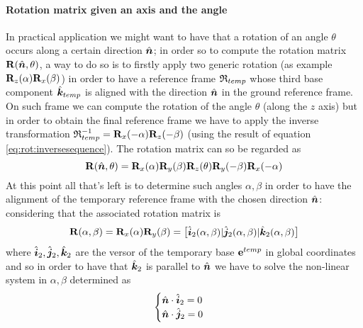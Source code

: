 		\paragraph{Rotation matrix given an axis and the angle} In practical application we might want to have that a rotation of an angle $\theta$ occurs along a certain direction $\hat{\boldsymbol{n}}$; in order so to compute the rotation matrix $\mathbf{R}(\hat{\boldsymbol{n}}, \theta)$, a way to do so is to firstly apply two generic rotation (as example $\mathbf{R}_z(\alpha) \mathbf{R}_x(\beta)$) in order to have a reference frame $\mathfrak {R}_{temp}$ whose third base component $\hat{\boldsymbol{k}}_{temp}$ is aligned with the direction $\hat{\boldsymbol{n}}$ in the ground reference frame. On such frame we can compute the rotation of the angle $\theta$ (along the $z$ axis) but in order to obtain the final reference frame we have to apply the inverse transformation $\mathfrak {R}_{temp}^{-1} = \mathbf{R}_x(-\alpha) \mathbf{R}_z(-\beta)$ (using the result of equation \ref{eq:rot:inversesequence}). The rotation matrix can so be regarded as
		\begin{equation}
			\mathbf{R}(\hat{\boldsymbol{n}},\theta) = \mathbf{R}_x(\alpha) \mathbf{R}_y(\beta) \mathbf{R}_z(\theta) \mathbf{R}_y(-\beta) \mathbf{R}_x(-\alpha)
		\end{equation}
		At this point all that's left is to determine such angles $\alpha,\beta$ in order to have the alignment of the temporary reference frame with the chosen direction $\hat{\boldsymbol{n}}$: considering that the associated rotation matrix is
		\[ \mathbf{R}(\alpha,\beta) = \mathbf{R}_x(\alpha) \mathbf{R}_y(\beta) = \begin{bmatrix} \hat{\boldsymbol{i}}_2(\alpha,\beta) | \hat{\boldsymbol{j}}_2(\alpha,\beta) | \hat{\boldsymbol{k}}_2(\alpha,\beta) \end{bmatrix} \]
		where $\hat{\boldsymbol{i}}_2,\hat{\boldsymbol{j}}_2,\hat{\boldsymbol{k}}_2$ are the versor of the temporary base $\mathbf{e}^{temp}$ in global coordinates and so in order to have that $\hat{\boldsymbol{k}}_2$ is parallel to $\hat{\boldsymbol{n}}$ we have to solve the non-linear system in $\alpha,\beta$ determined as
		\[ \begin{cases}
			\hat{\boldsymbol{n}} \cdot \hat{\boldsymbol{i}}_2 = 0 \\ \hat{\boldsymbol{n}}\cdot \hat{\boldsymbol{j}}_2 = 0
		\end{cases} \]
	
